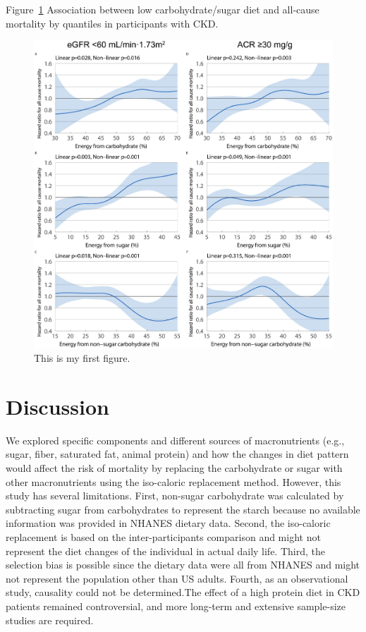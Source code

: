 \documentclass[12pt]{article}
\begin{document}
Figure~\ref{fig:111} Association between low carbohydrate/sugar diet and all-cause mortality by quantiles in participants with CKD.


\begin{figure}[tbp]
  \centering
  \includegraphics[width=\textwidth]{111.jpg}
  \caption{This is my first figure.}
  \label{fig:111}
\end{figure}

\section{Discussion}
\label{sec:disc}

We explored specific components and different sources of macronutrients (e.g., sugar, fiber, saturated fat, animal protein) and how the changes in diet pattern would affect the risk of mortality by replacing the carbohydrate or sugar with other macronutrients using the iso-caloric replacement method. However, this study has several limitations. First, non-sugar carbohydrate was calculated by subtracting sugar from carbohydrates to represent the starch because no available information was provided in NHANES dietary data. Second, the iso-caloric replacement is based on the inter-participants comparison and might not represent the diet changes of the individual in actual daily life. Third, the selection bias is possible since the dietary data were all from NHANES and might not represent the population other than US adults. Fourth, as an observational study, causality could not be determined.The effect of a high protein diet in CKD patients remained controversial, and more long-term and extensive sample-size studies are required\cite{ren2023associations}.



\end{document}
